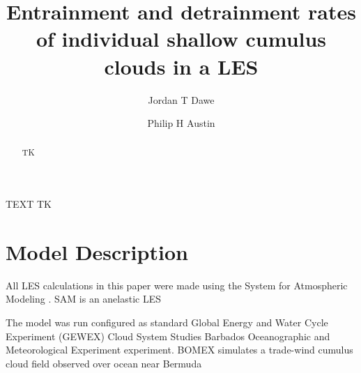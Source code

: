 \documentclass[acp]{copernicus}
\begin{document}
\title{Entrainment and detrainment rates of individual shallow cumulus clouds 
in a LES}


\author[1]{Jordan T Dawe}
\author[1]{Philip H Austin}










\received{}
\pubdiscuss{} %
\revised{}
\accepted{}
\published{}




\maketitle



\begin{abstract}
TK
\end{abstract}





\introduction

TEXT TK


\section{Model Description}

All LES calculations in this paper were made using the System for Atmospheric 
Modeling \citep[SAM;][]{Khairoutdinov2003}.  SAM is an anelastic LES 

The model was run configured as standard Global Energy and Water
Cycle Experiment (GEWEX) Cloud System Studies \citep[GCSS;][]{Randall2003}
Barbados Oceanographic and Meteorological Experiment 
\citep[BOMEX;][]{Siebesma2003} experiment.  BOMEX simulates a trade-wind cumulus 
cloud field observed over ocean near Bermuda
\end{document}
